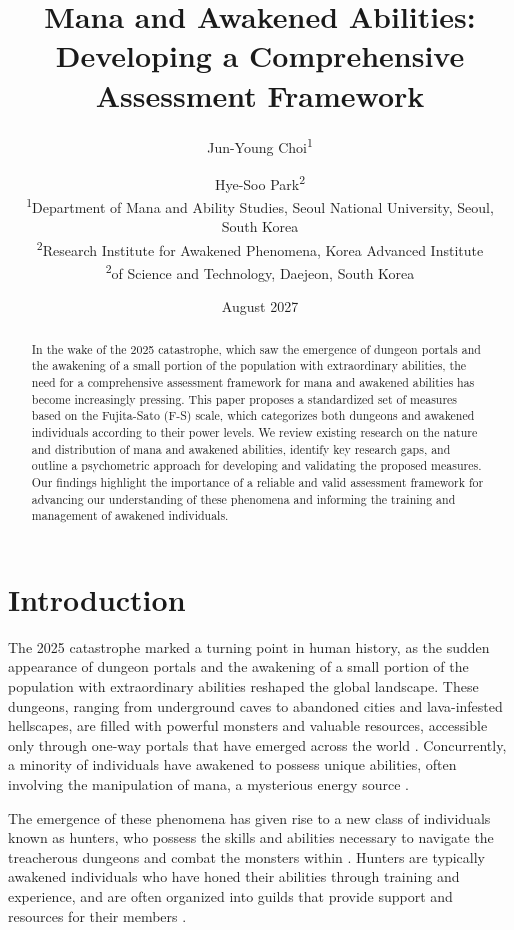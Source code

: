 \documentclass[12pt, a4paper]{article}
\title{Mana and Awakened Abilities: \\Developing a Comprehensive Assessment Framework}
\author{Jun-Young Choi\textsuperscript{1} \and Hye-Soo Park\textsuperscript{2} \\
\small \textsuperscript{1}Department of Mana and Ability Studies, Seoul National University, Seoul, South Korea\\
\small \textsuperscript{2}Research Institute for Awakened Phenomena, Korea Advanced Institute \\ \small \textsuperscript{2}of Science and Technology, Daejeon, South Korea}
\date{August 2027}
\begin{document}
\maketitle

\begin{abstract}
In the wake of the 2025 catastrophe, which saw the emergence of dungeon portals and the awakening of a small portion of the population with extraordinary abilities, the need for a comprehensive assessment framework for mana and awakened abilities has become increasingly pressing. This paper proposes a standardized set of measures based on the Fujita-Sato (F-S) scale, which categorizes both dungeons and awakened individuals according to their power levels. We review existing research on the nature and distribution of mana and awakened abilities, identify key research gaps, and outline a psychometric approach for developing and validating the proposed measures. Our findings highlight the importance of a reliable and valid assessment framework for advancing our understanding of these phenomena and informing the training and management of awakened individuals.
\end{abstract}

\section{Introduction}

The 2025 catastrophe marked a turning point in human history, as the sudden appearance of dungeon portals and the awakening of a small portion of the population with extraordinary abilities reshaped the global landscape. These dungeons, ranging from underground caves to abandoned cities and lava-infested hellscapes, are filled with powerful monsters and valuable resources, accessible only through one-way portals that have emerged across the world \citep{Nakamura2026}. Concurrently, a minority of individuals have awakened to possess unique abilities, often involving the manipulation of mana, a mysterious energy source \citep{Kimura2026}.

The emergence of these phenomena has given rise to a new class of individuals known as hunters, who possess the skills and abilities necessary to navigate the treacherous dungeons and combat the monsters within \citep{Sato2027}. Hunters are typically awakened individuals who have honed their abilities through training and experience, and are often organized into guilds that provide support and resources for their members \citep{Watanabe2027}.
\end{document}
